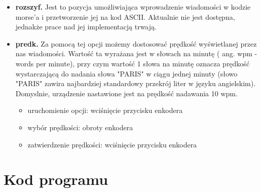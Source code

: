 \documentclass{article}
\begin{document}
\begin{itemize}
	\item	\textbf{rozszyf.}\newline
Jest to pozycja umożliwiająca wprowadzenie wiadomości w kodzie morse'a i przetworzenie jej na kod ASCII. Aktualnie nie jest dostępna, jednakże prace nad jej implementacją trwają.
	\item	\textbf{predk.}\newline
Za pomocą tej opcji możemy dostosować prędkość wyświetlanej przez nas wiadomości. Wartość ta wyrażana jest w słowach na minutę ( ang. wpm - words per minute), przy czym wartość 1 słowa na minutę oznacza prędkość wystarczającą do nadania słowa "PARIS" w ciągu jednej minuty (słowo "PARIS" zawira najbardziej standardowy przekrój liter w języku angielskim). Domyslnie, urządzenie nastawione jest na prędkość nadawania 10 wpm.

	\begin{itemize}
	\item uruchomienie opcji: wciśnięcie przycisku enkodera
	\item wybór prędkości: obroty enkodera
	\item zatwierdzenie prędkości: wciśnięcie przycisku enkodera
	\end{itemize}

\end{itemize}

\section{Kod programu}
\end{document}

